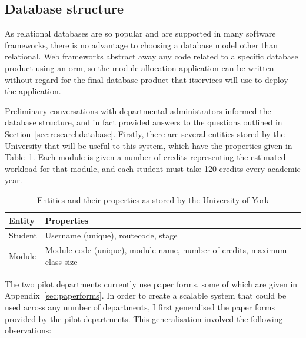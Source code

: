 
\subsection{Database structure}
\label{developmentdatabasestructure}

As relational databases are so popular and are supported in many software
frameworks, there is no advantage to choosing a database model other than
relational. Web frameworks abstract away any code related to a specific
database product using an \gls{orm}, so the module allocation application can
be written without regard for the final database product that \gls{itservices}
will use to deploy the application.

Preliminary conversations with departmental administrators informed the
database structure, and in fact provided answers to the questions outlined in
Section~\ref{sec:researchdatabase}. Firstly, there are several entities stored
by the University that will be useful to this system, which have the
properties given in Table~\ref{development_database_uni_entities}. Each module
is given a number of credits representing the estimated workload for that
module, and each student must take 120 credits every academic year.

\begin{table}
  \begin{center}
    \begin{tabular}{ | l | l | }
      \hline
      \textbf{Entity} & \textbf{Properties} \\
      \hline
      Student    & Username (unique), \gls{routecode}, \gls{stage} \\
      Module     & Module code (unique), module name, number of credits, maximum class size \\
      \hline
    \end{tabular}    
  \end{center}
  \caption{Entities and their properties as stored by the University of York}
  \label{development_database_uni_entities}
\end{table}

The two pilot departments currently use paper forms, some of which are given
in Appendix~\ref{sec:paperforms}. In order to create a scalable system that
could be used across any number of departments, I first generalised the paper
forms provided by the pilot departments. This generalisation involved the
following observations:

